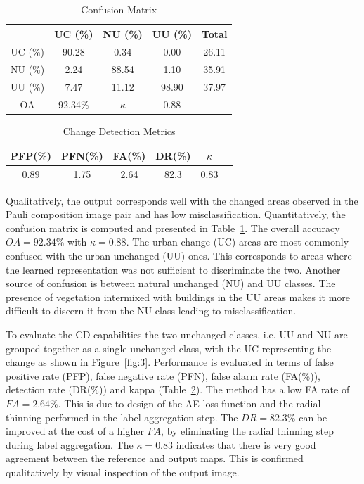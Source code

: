 \begin{table}[btp]
	\centering
	\caption{Confusion Matrix}
	\label{tab:conf}
	\begin{tabular}{cccc|c}
		&  UC (\%)  & NU (\%) & UU (\%) & Total \\ \hline
		UC (\%) & 90.28 & 0.34 &  0.00 & 26.11 \\
		NU (\%) & 2.24 & 88.54 & 1.10  & 35.91\\
		UU (\%) & 7.47 & 11.12 & 98.90 & 37.97\\ \hline
		OA   & 92.34\% &  $\kappa$   & 0.88 & \\ 
	\end{tabular}
	
\end{table}
\begin{table}[btp]
	\centering
	\caption{Change Detection Metrics}
	\label{tab:cd}
	\begin{tabular}{c c c c c c}
		PFP(\%)  & PFN(\%) & FA(\%) & DR(\%) & $\kappa$ \\ \hline
		0.89 & 1.75 & 2.64 & 82.3 & 0.83 \\
	\end{tabular}
\end{table}

Qualitatively, the  output corresponds well with the changed areas observed in the Pauli composition image pair and has low misclassification. Quantitatively, 
the confusion matrix is computed and presented in Table~\ref{tab:conf}.  The overall accuracy $OA = 92.34\%$ with $\kappa = 0.88$. The urban change (UC) areas are most commonly confused with the urban unchanged (UU) ones. This corresponds to areas where the learned representation was not sufficient to discriminate the two.
Another source of confusion is between natural unchanged (NU) and UU classes. The presence of vegetation intermixed with buildings in the UU areas makes it more difficult to discern it from the NU class leading to misclassification.

To evaluate the CD capabilities the two unchanged classes, i.e. UU and NU are grouped together as a single unchanged class, with the UC representing the change as shown in Figure~\ref{fig:3}. Performance is evaluated in terms of false positive rate (PFP), false negative rate (PFN), false alarm rate (FA(\%)), detection rate (DR(\%)) and kappa (Table~\ref{tab:cd}). The method has a low FA rate of $FA=2.64\%$. This is due to design of the AE loss function and the radial thinning performed in the label aggregation step. The $DR=82.3\%$ can be improved at the cost of a higher $FA$, by eliminating the radial thinning step during label aggregation. The $\kappa=0.83$ indicates that there is very good agreement between the reference and output maps. This is confirmed qualitatively by visual inspection of the output image. 







